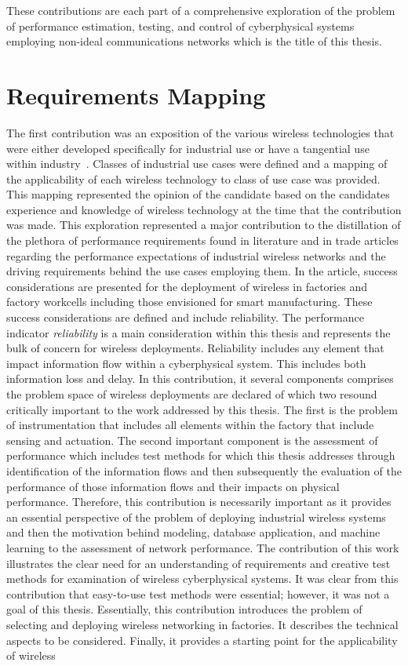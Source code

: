 These contributions are each part of a comprehensive exploration of the problem of performance estimation, testing, and control of cyberphysical systems employing non-ideal communications networks which is the title of this thesis.  

\section{Requirements Mapping}

The first contribution was an exposition of the various wireless technologies that were either developed specifically for industrial use or have a tangential use within industry~\cite{CandellRW2017}.  Classes of industrial use cases were defined and a mapping of the applicability of each wireless technology to class of use case was provided.  This mapping represented the opinion of the candidate based on the candidates experience and knowledge of wireless technology at the time that the contribution was made.  This exploration represented a major contribution to the distillation of the plethora of performance requirements found in literature and in trade articles regarding the performance expectations of industrial wireless networks and the driving requirements behind the use cases employing them.  In the article, success considerations are presented for the deployment of wireless in factories and factory workcells including those envisioned for smart manufacturing.  These success considerations are defined and include reliability.  The performance indicator \textit{reliability} is a main consideration within this thesis and represents the bulk of  concern for wireless deployments.  Reliability includes any element that impact information flow within a cyberphysical system.  This includes both information loss and delay.  In this contribution, it several components comprises the problem space of wireless deployments are declared of which two resound critically important to the work addressed by this thesis.  The first is the problem of instrumentation that includes all elements within the factory that include sensing and actuation.  The second important component is the assessment of performance which includes test methods for which this thesis addresses through identification of the information flows and then subsequently the evaluation of the performance of those information flows and their impacts on physical performance.  Therefore, this contribution is necessarily important as it provides an essential perspective of the problem of deploying industrial wireless systems and then the motivation behind modeling, database application, and machine learning to the assessment of network performance.  The contribution of this work illustrates the clear need for an understanding of requirements and creative test methods for examination of wireless cyberphysical systems.  It was clear from this contribution that easy-to-use test methods were essential; however, it was not a goal of this thesis.  Essentially, this contribution introduces the problem of selecting and deploying wireless networking in factories.  It describes the technical aspects to be considered.  Finally, it provides a starting point for the applicability of wireless 